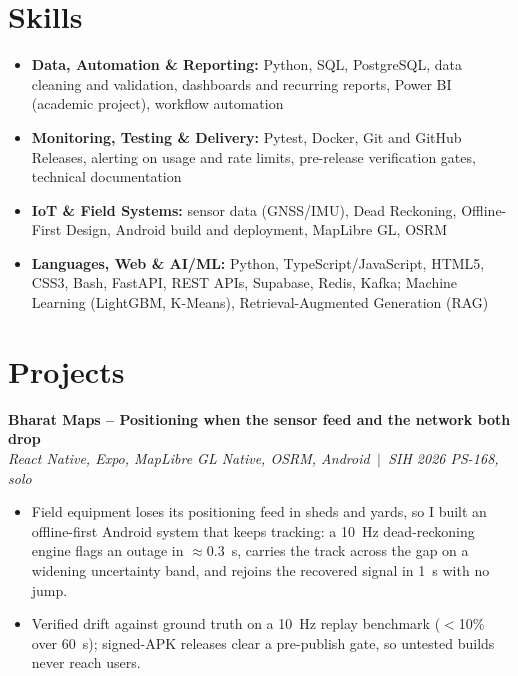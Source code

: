 \documentclass[letterpaper,11pt]{article}
\begin{document}
\section{Skills}
\begin{itemize}
  \item \textbf{Data, Automation \& Reporting:} Python, SQL, PostgreSQL, data cleaning and validation,
        dashboards and recurring reports, Power BI (academic project), workflow automation
  \item \textbf{Monitoring, Testing \& Delivery:} Pytest, Docker, Git and GitHub Releases, alerting on
        usage and rate limits, pre-release verification gates, technical documentation
  \item \textbf{IoT \& Field Systems:} sensor data (GNSS/IMU), Dead Reckoning, Offline-First Design,
        Android build and deployment, MapLibre GL, OSRM
  \item \textbf{Languages, Web \& AI/ML:} Python, TypeScript/JavaScript, HTML5, CSS3, Bash, FastAPI, REST
        APIs, Supabase, Redis, Kafka; Machine Learning (LightGBM, K-Means), Retrieval-Augmented Generation (RAG)
\end{itemize}

\section{Projects}
\textbf{Bharat Maps -- Positioning when the sensor feed and the network both drop} \\
\hspace*{0.15in}\textit{React Native, Expo, MapLibre GL Native, OSRM, Android \,$|$\, SIH 2026 PS-168, solo}
\begin{itemize}[leftmargin=0.32in,labelsep=0.45em,itemsep=1pt,topsep=2pt,partopsep=0pt,parsep=0pt]
  \item Field equipment loses its positioning feed in sheds and yards, so I built an offline-first Android
        system that keeps tracking: a 10~Hz dead-reckoning engine flags an outage in $\approx$0.3~s, carries
        the track across the gap on a widening uncertainty band, and rejoins the recovered signal in 1~s
        with no jump.
  \item Verified drift against ground truth on a 10~Hz replay benchmark ($<$10\% over 60~s); signed-APK
        releases clear a pre-publish gate, so untested builds never reach users.
\end{itemize}
\end{document}
